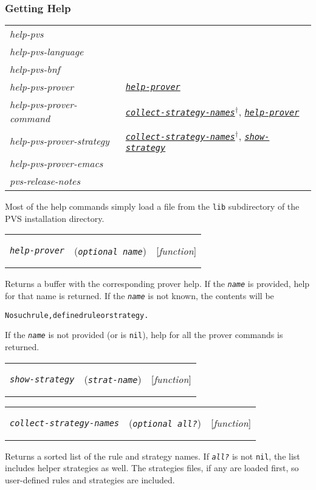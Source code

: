\documentclass[12pt]{book}
\makeatletter
\def\ampoptional{{\smaller\sc {\smaller\smaller \&}optional\ }}
\newenvironment{function}[3]%
{\par\noindent\begin{boxedminipage}{\textwidth}%
 \par\noindent\begin{tabularx}{\linewidth}{l>{\raggedright}Xr}%
 \functionhtgt{#1}&(\texttt{\textit{#2}})&[\emph{#3}]%
 \end{tabularx}\par\flushright\begin{minipage}{.97\textwidth}}
{\end{minipage}\end{boxedminipage}}
\newcommand{\functionarg}[1]{\texttt{\textit{#1}}}
\newcommand{\functionnm}[1]{\texttt{\textit{#1}}}
\newcommand{\functionhln}[1]{\hyperlink{#1}{\functionnm{#1}}}
\newcommand{\functionhtgt}[1]{\hypertarget{#1}{\functionnm{#1}}\index{#1@\functionnm{#1}|underline}}
\newenvironment{lispfunction}[2]%
{\begin{function}{#1}{#2}{function}}{\end{function}}
\makeatother
\begin{document}
\subsubsection{Getting Help}

\noindent\begin{tabularx}{\linewidth}{|>{\itshape\ttfamily}l|>{\raggedright\arraybackslash}X|}\hline
  help-pvs & \\
  help-pvs-language & \\
  help-pvs-bnf & \\
  help-pvs-prover & \functionhln{help-prover} \\
  help-pvs-prover-command
    & \functionhln{collect-strategy-names}$^\dagger$,
      \functionhln{help-prover} \\
  help-pvs-prover-strategy
    & \functionhln{collect-strategy-names}$^\dagger$,
      \functionhln{show-strategy} \\
  help-pvs-prover-emacs & \\
  pvs-release-notes & \\ \hline
\end{tabularx}

Most of the help commands simply load a file from the \texttt{lib}
subdirectory of the PVS installation directory.

\begin{lispfunction}{help-prover}{\ampoptional name}
Returns a buffer with the corresponding prover help.  If the
\functionarg{name} is provided, help for that name is returned.  If the
\functionarg{name} is not known, the contents will be
\begin{alltt}
  No such rule, defined rule or strategy.
\end{alltt}
If the \functionarg{name} is not provided (or is \texttt{nil}), help for
all the prover commands is returned.
\end{lispfunction}

\begin{lispfunction}{show-strategy}{strat-name}
\end{lispfunction}

\begin{lispfunction}{collect-strategy-names}{\ampoptional all?}
Returns a sorted list of the rule and strategy names.  If
\functionarg{all?} is not \texttt{nil}, the list includes helper
strategies as well.  The strategies files, if any are loaded first, so
user-defined rules and strategies are included.
\end{lispfunction}
\end{document}
